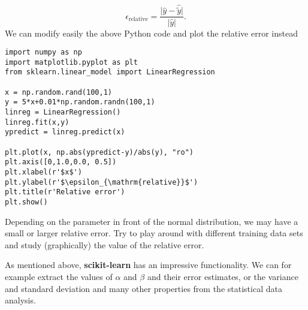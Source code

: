 \documentclass[%
oneside,                 %
final,                   %
10pt]{article}
\begin{document}
\[
\epsilon_{\mathrm{relative}}= \frac{\vert \hat{y} -\hat{\tilde{y}}\vert}{\vert \hat{y}\vert}.
\]
We can modify easily the above Python code and plot the relative error instead
\begin{verbatim}
import numpy as np
import matplotlib.pyplot as plt
from sklearn.linear_model import LinearRegression

x = np.random.rand(100,1)
y = 5*x+0.01*np.random.randn(100,1)
linreg = LinearRegression()
linreg.fit(x,y)
ypredict = linreg.predict(x)

plt.plot(x, np.abs(ypredict-y)/abs(y), "ro")
plt.axis([0,1.0,0.0, 0.5])
plt.xlabel(r'$x$')
plt.ylabel(r'$\epsilon_{\mathrm{relative}}$')
plt.title(r'Relative error')
plt.show()
\end{verbatim}

Depending on the parameter in front of the normal distribution, we may
have a small or larger relative error. Try to play around with
different training data sets and study (graphically) the value of the
relative error.

As mentioned above, \textbf{scikit-learn} has an impressive functionality.
We can for example extract the values of $\alpha$ and $\beta$ and
their error estimates, or the variance and standard deviation and many
other properties from the statistical data analysis. 
\end{document}
